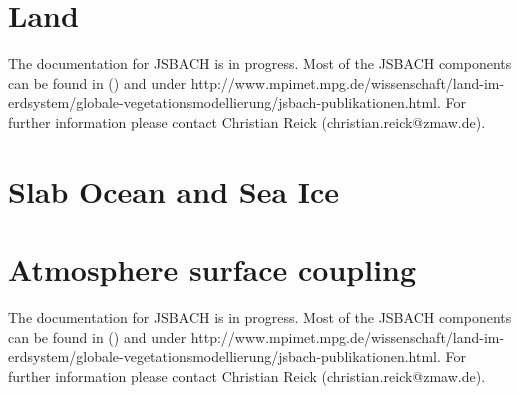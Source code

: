 \documentclass[DIV14,BCOR1cm,11pt,a4paper,twoside]{scrreprt}
\begin{document}
%

%

%

%

\chapter{Land}
The documentation for JSBACH is in progress. Most of the JSBACH components can be found in (\cite{raddatz2007}) and under http://www.mpimet.mpg.de/wissenschaft/land-im-erdsystem/globale-vegetationsmodellierung/jsbach-publikationen.html. For further information please contact Christian Reick (christian.reick@zmaw.de).

\chapter{Slab Ocean and Sea Ice}
%

%
%


\chapter{Atmosphere surface coupling}
The documentation for JSBACH is in progress. Most of the JSBACH components can be found in (\cite{raddatz2007}) and under http://www.mpimet.mpg.de/wissenschaft/land-im-erdsystem/globale-vegetationsmodellierung/jsbach-publikationen.html. For further information please contact Christian Reick (christian.reick@zmaw.de).

%
%



\end{document}
